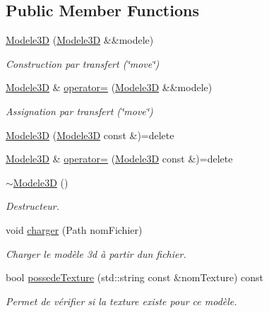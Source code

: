 \subsection*{Public Member Functions}
\begin{DoxyCompactItemize}
\item 
\hyperlink{classmodele_1_1_modele3_d_a235e9fd8dddc14392f922fefaa11255a}{Modele3\+D} (\hyperlink{classmodele_1_1_modele3_d}{Modele3\+D} \&\&modele)
\begin{DoxyCompactList}\small\item\em Construction par transfert (\char`\"{}move\char`\"{}) \end{DoxyCompactList}\item 
\hyperlink{classmodele_1_1_modele3_d}{Modele3\+D} \& \hyperlink{classmodele_1_1_modele3_d_a34a330415e383970df2f479994f00dd6}{operator=} (\hyperlink{classmodele_1_1_modele3_d}{Modele3\+D} \&\&modele)
\begin{DoxyCompactList}\small\item\em Assignation par transfert (\char`\"{}move\char`\"{}) \end{DoxyCompactList}\item 
\hyperlink{classmodele_1_1_modele3_d_a1b028ca06d9bb0adda731be23de6d03b}{Modele3\+D} (\hyperlink{classmodele_1_1_modele3_d}{Modele3\+D} const \&)=delete
\item 
\hyperlink{classmodele_1_1_modele3_d}{Modele3\+D} \& \hyperlink{classmodele_1_1_modele3_d_af0336d4d17bb80b294b7b3d6212f94ba}{operator=} (\hyperlink{classmodele_1_1_modele3_d}{Modele3\+D} const \&)=delete
\item 
\hyperlink{classmodele_1_1_modele3_d_a1d3f1af73cee1aa3839dcd0eae9d1918}{$\sim$\+Modele3\+D} ()
\begin{DoxyCompactList}\small\item\em Destructeur. \end{DoxyCompactList}\item 
void \hyperlink{classmodele_1_1_modele3_d_aeb916b8eb492aef3aab86236773b81fb}{charger} (Path nom\+Fichier)
\begin{DoxyCompactList}\small\item\em Charger le modèle 3d à partir d\textquotesingle{}un fichier. \end{DoxyCompactList}\item 
bool \hyperlink{classmodele_1_1_modele3_d_a30920574e97a562609db9a2bde5df032}{possede\+Texture} (std\+::string const \&nom\+Texture) const 
\begin{DoxyCompactList}\small\item\em Permet de vérifier si la texture existe pour ce modèle. \end{DoxyCompactList}\item 

\end{DoxyCompactItemize}
